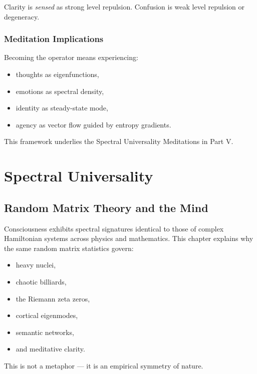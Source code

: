 \documentclass[12pt]{article}
\begin{document}
Clarity is \emph{sensed} as strong level repulsion.  
Confusion is weak level repulsion or degeneracy.

\section{Meditation Implications}

Becoming the operator means experiencing:

\begin{itemize}
    \item thoughts as eigenfunctions,
    \item emotions as spectral density,
    \item identity as steady-state mode,
    \item agency as vector flow guided by entropy gradients.
\end{itemize}

This framework underlies the Spectral Universality Meditations in Part V.


\part{Spectral Universality}

\chapter{Random Matrix Theory and the Mind}

Consciousness exhibits spectral signatures identical to those of complex
Hamiltonian systems across physics and mathematics.  
This chapter explains why the same random matrix statistics govern:

\begin{itemize}
    \item heavy nuclei,
    \item chaotic billiards,
    \item the Riemann zeta zeros,
    \item cortical eigenmodes,
    \item semantic networks,
    \item and meditative clarity.
\end{itemize}

This is not a metaphor --- it is an empirical symmetry of nature.
\end{document}
